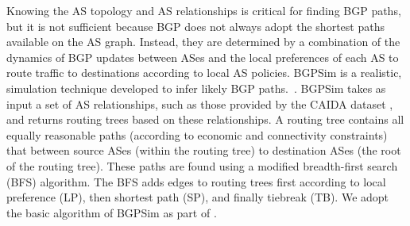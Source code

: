 \par Knowing the AS topology and AS relationships is critical for finding BGP paths, but it is not sufficient because BGP does not always adopt
the shortest paths available on the
AS graph. Instead, they are determined by a combination of the dynamics of
BGP updates between ASes and the local preferences of each AS to route traffic
to destinations according to local AS policies.
BGPSim is a realistic, simulation technique developed to infer likely BGP paths.~\cite{quicksand}. BGPSim takes as input a set of AS
relationships, such as those provided by the CAIDA dataset
\cite{CAIDA}, and returns routing trees based on these
relationships. A routing tree contains all
equally reasonable paths (according to economic and connectivity constraints) that between source ASes (within the routing tree) to destination ASes (the
root of the routing tree). These paths are found using a modified breadth-first
search (BFS) algorithm. The BFS adds edges to routing trees first
according to local preference (LP), then shortest path (SP), and
finally tiebreak (TB).
We adopt the basic algorithm of BGPSim
as part of \toolname{}.

